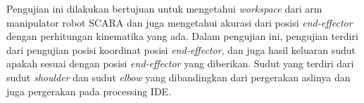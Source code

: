  Pengujian ini dilakukan bertujuan untuk mengetahui \textit{workspace} dari arm manipulator robot SCARA dan juga mengetahui akurasi dari posisi \textit{end-effector} dengan perhitungan kinematika yang ada.
Dalam pengujian ini, pengujian terdiri dari pengujian posisi koordinat posisi \textit{end-effector}, dan juga hasil keluaran sudut apakah sesuai dengan posisi \textit{end-effector} yang diberikan. Sudut yang terdiri dari sudut \textit{shoulder} dan sudut \textit{elbow} yang dibandingkan dari pergerakan aslinya dan juga pergerakan pada processing IDE.  
